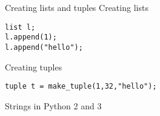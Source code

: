 \begin{frame}[fragile]{Creating lists and tuples}
    Creating lists
    \begin{verbatim}
list l;
l.append(1);
l.append("hello");
    \end{verbatim}

    Creating tuples
    \begin{verbatim}
tuple t = make_tuple(1,32,"hello");
    \end{verbatim}
\end{frame}

\begin{frame}[fragile]{Strings in Python 2 and 3}
\end{frame}



